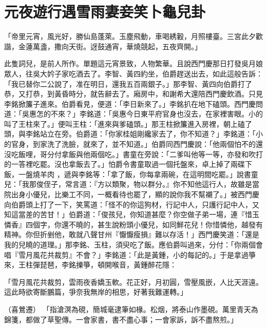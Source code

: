 %

\chapter{元夜遊行遇雪雨\KG 妻妾笑卜龜兒卦}


\begin{showcontents}{}



「帝里元宵，風光好，勝仙島蓬萊。玉塵飛動，車喝綉轂，月照樓臺。三宮此夕歡諧，金蓮萬盞，撒向天街。迓鼓通宵，華燒競起，五夜齊開。」

此隻詞兒，是前人所作。單題這元宵景致，人物繁華。且說西門慶那日打發吳月娘眾人，往吳大妗子家吃酒去了。李智、黃四約坐，伯爵趕送出去，如此這般告訴：「我已替你二公說了，准在明日，還我五百兩銀子。」那李智、黃四向伯爵打了恭，又打恭，到黃昏時分，就告辭去了。廂房中，和謝希大還陪西門慶飲酒。只見李銘掀簾子進來。伯爵看見，便道：「李日新來了。」李銘扒在地下磕頭。西門慶問道：「吳惠怎的不來？」李銘道：「吳惠今日東平府官身也沒去，在家裡害眼。小的叫了王柱來了。」便叫王柱：「進來與爹磕頭。」那王柱掀簾進入房裡，朝上磕了頭，與李銘站立在旁。伯爵道：「你家桂姐剛纔家去了，你不知道？」李銘道：「小的官身，到家洗了洗臉，就來了，並不知道。」伯爵同西門慶說：「他兩個怕不的還沒吃飯哩，哥分付拿飯與他兩個吃。」書童在旁說：「二爹叫他等一等，亦發和吹打的一答裡吃罷。沒也拿飯去了。」怕爵令書童取過一個托盤來，卓上掉了兩碟下飯，一盤燒羊肉 ，遞與李銘等：「拿了飯，你每拿兩碗，在這明間吃罷。」說書童兒：「我那俊侄子，常言道：『方以類聚，物以群分。』你不知他這行人，故雖是當院出身小優兒，比樂工不同，一概看待也罷了，顯的說你我不幫襯了。」被西門慶向伯爵頭上打了一下，笑罵道：「怪不的你這狗材，行記中人，只護行記中人，又知這當差的苦甘！」伯爵道：「俊孩兒，你知道甚麼？你空做子弟一場，連『惜玉憐香』四個字，你還不曉的，甚生說粉頭小優兒，如同鮮花兒！你惜憐他，越發有精神。你但折剉他，敢就八聲甘州『懨懨瘦損』難以存活！」西門慶笑道：「還是我的兒曉的道理。」那李銘、玉柱，須臾吃了飯。應伯爵叫過來，分付：「你兩個會唱『雪月風花共裁剪』不會？」李銘道：「此是黃鍾，小的每記的。」于是拿過箏來，王柱彈琵琶，李銘擽箏，頓開喉音，黃鍾醉花隱：

「雪月風花共裁剪，雲雨夜香嬌玉軟。花正好，月初圓，雪壓風嵌，人比天涯遠。這此時欲寄斷鵬篇，爭奈我無岸的相思，好著我難運轉。」

（喜鶯遷）  「指滄溟為硯，簡城毫逮筆如椽。松烟，將泰山作墨硯。萬里青天為錦箋，都做了草聖傳。一會家書，書不盡心事；一會家訴，訴不盡熬煎。」


\end{showcontents}
